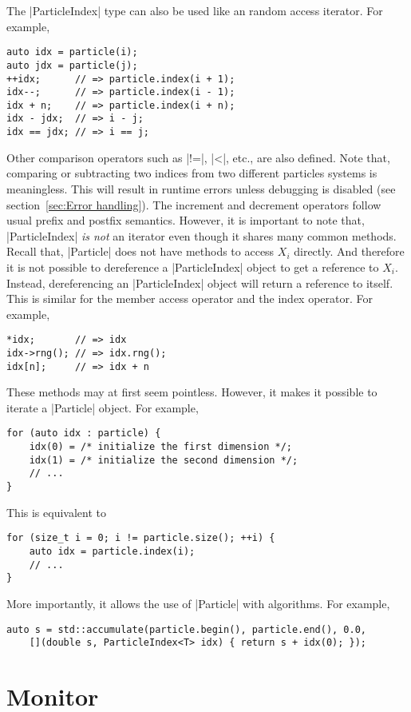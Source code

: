 The |ParticleIndex| type can also be used like an random access iterator. For
example,
\begin{verbatim}
auto idx = particle(i);
auto jdx = particle(j);
++idx;      // => particle.index(i + 1);
idx--;      // => particle.index(i - 1);
idx + n;    // => particle.index(i + n);
idx - jdx;  // => i - j;
idx == jdx; // => i == j;
\end{verbatim}
Other comparison operators such as |!=|, |<|, etc., are also defined. Note
that, comparing or subtracting two indices from two different particles systems
is meaningless. This will result in runtime errors unless debugging is disabled
(see section~\ref{sec:Error handling}). The increment and decrement operators
follow usual prefix and postfix semantics. However, it is important to note
that, |ParticleIndex| \emph{is not} an iterator even though it shares many
common methods. Recall that, |Particle| does not have methods to access $X_i$
directly. And therefore it is not possible to dereference a |ParticleIndex|
object to get a reference to $X_i$. Instead, dereferencing an |ParticleIndex|
object will return a reference to itself. This is similar for the member access
operator and the index operator. For example,
\begin{verbatim}
*idx;       // => idx
idx->rng(); // => idx.rng();
idx[n];     // => idx + n
\end{verbatim}
These methods may at first seem pointless. However, it makes it possible to
iterate a |Particle| object. For example,
\begin{verbatim}
for (auto idx : particle) {
    idx(0) = /* initialize the first dimension */;
    idx(1) = /* initialize the second dimension */;
    // ...
}
\end{verbatim}
This is equivalent to
\begin{verbatim}
for (size_t i = 0; i != particle.size(); ++i) {
    auto idx = particle.index(i);
    // ...
}
\end{verbatim}
More importantly, it allows the use of |Particle| with algorithms. For example,
\begin{verbatim}
auto s = std::accumulate(particle.begin(), particle.end(), 0.0,
    [](double s, ParticleIndex<T> idx) { return s + idx(0); });
\end{verbatim}

\section{Monitor}
\label{sec:Monitor}

